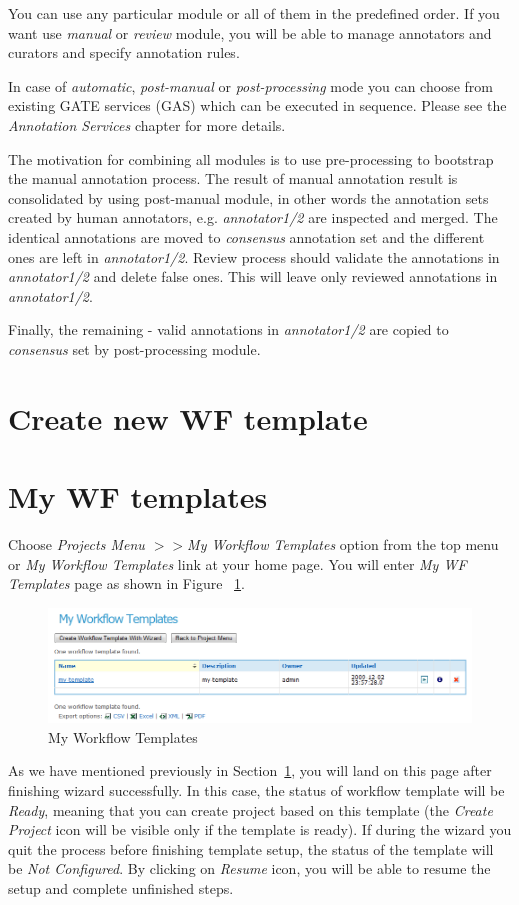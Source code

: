 You can use any particular module or all of them in the predefined order.
If you want use \emph{manual} or \emph{review} module, you will be able to manage
annotators and curators and specify annotation rules. 

In case of \emph{automatic}, \emph{post-manual}  or \emph{post-processing} 
mode you can choose from existing GATE services (GAS) which can be executed in
sequence. Please see the \emph{Annotation Services} chapter for more details. 

The motivation for combining all modules is to use pre-processing to
bootstrap the manual annotation process. The result of
manual annotation result is consolidated by using post-manual module, in other
words the annotation sets created by human annotators, e.g. \emph{annotator1/2}
are inspected and merged. The identical annotations are moved to \emph{consensus} annotation set and the
different ones are left in \emph{annotator1/2}.
Review process should validate the annotations in \emph{annotator1/2} and
delete false ones. This will leave only reviewed annotations in
\emph{annotator1/2}.

Finally, the remaining - valid annotations in \emph{annotator1/2} are copied to
\emph{consensus} set by post-processing module.

\section{Create new WF template}\label{section:create-new-template}


\section{My WF templates}\label{section:wf-templates}
Choose \emph{Projects Menu $>>$My Workflow Templates} option from the top menu
or \emph{My Workflow Templates} link at your home page.
You will enter \emph{My WF Templates} page as shown in Figure
~\ref{fig:mywftemplates}.
\begin{figure}[htb]
\centering
\includegraphics[scale=0.4]{mywftemplates}
\caption{My Workflow Templates}
\label{fig:mywftemplates}
\end{figure}
As we have mentioned previously in Section~\ref{section:create-new-template},
you will land on this page after finishing wizard successfully. In this case,
the status of workflow template will be \emph{Ready}, meaning that you can
create project based on this template (the \emph{Create Project} icon will be
visible only if the template is ready). If during the wizard you quit the
process before finishing template setup, the status of the template will be
\emph{Not Configured}. By clicking on \emph{Resume} icon, you will be able to
resume the setup and complete unfinished steps.

